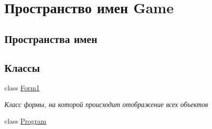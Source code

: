 \hypertarget{namespace_game}{}\section{Пространство имен Game}
\label{namespace_game}
\subsection*{Пространства имен}
\begin{DoxyCompactItemize}
\end{DoxyCompactItemize}
\subsection*{Классы}
\begin{DoxyCompactItemize}
\item 
class \hyperlink{class_game_1_1_form1}{Form1}
\begin{DoxyCompactList}\small\item\em Класс формы, на которой происходит отображение всех объектов \end{DoxyCompactList}\item 
class \hyperlink{class_game_1_1_program}{Program}
\end{DoxyCompactItemize}
